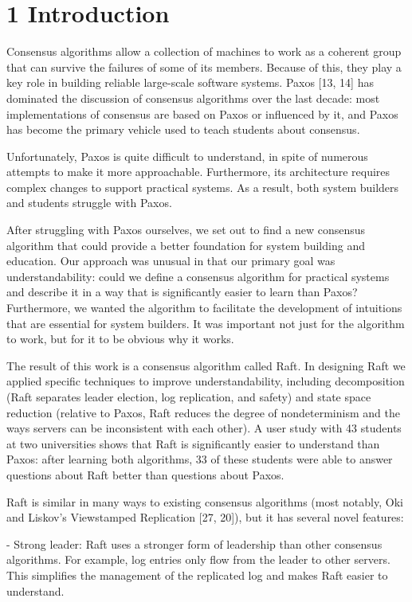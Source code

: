 \documentclass[
]{article}
\begin{document}
\section{1 Introduction}\label{introduction}

Consensus algorithms allow a collection of machines to work as a
coherent group that can survive the failures of some of its members.
Because of this, they play a key role in building reliable large-scale
software systems. Paxos {[}13, 14{]} has dominated the discussion of
consensus algorithms over the last decade: most implementations of
consensus are based on Paxos or influenced by it, and Paxos has become
the primary vehicle used to teach students about consensus.

Unfortunately, Paxos is quite difficult to understand, in spite of
numerous attempts to make it more approachable. Furthermore, its
architecture requires complex changes to support practical systems. As a
result, both system builders and students struggle with Paxos.

After struggling with Paxos ourselves, we set out to find a new
consensus algorithm that could provide a better foundation for system
building and education. Our approach was unusual in that our primary
goal was understandability: could we define a consensus algorithm for
practical systems and describe it in a way that is significantly easier
to learn than Paxos? Furthermore, we wanted the algorithm to facilitate
the development of intuitions that are essential for system builders. It
was important not just for the algorithm to work, but for it to be
obvious why it works.

The result of this work is a consensus algorithm called Raft. In
designing Raft we applied specific techniques to improve
understandability, including decomposition (Raft separates leader
election, log replication, and safety) and state space reduction
(relative to Paxos, Raft reduces the degree of nondeterminism and the
ways servers can be inconsistent with each other). A user study with 43
students at two universities shows that Raft is significantly easier to
understand than Paxos: after learning both algorithms, 33 of these
students were able to answer questions about Raft better than questions
about Paxos.

Raft is similar in many ways to existing consensus algorithms (most
notably, Oki and Liskov's Viewstamped Replication {[}27, 20{]}), but it
has several novel features:

- Strong leader: Raft uses a stronger form of leadership than other
consensus algorithms. For example, log entries only flow from the leader
to other servers. This simplifies the management of the replicated log
and makes Raft easier to understand.
\end{document}
